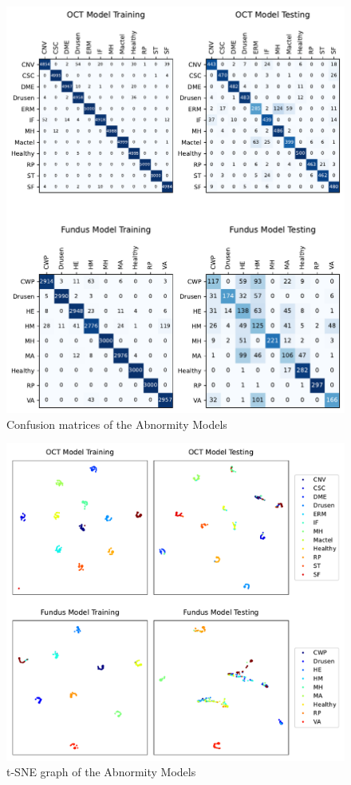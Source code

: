 \documentclass{article}
\begin{document}
	\begin{figure}[htbp]
		\centering
		\includegraphics[width=\linewidth]{Figs/abnormity_confusion_matrix.pdf}
		\caption{Confusion matrices of the Abnormity Models}
		\vspace{0.3cm}
		\label{fig:A_conf_mat}
	\end{figure}
	
	\begin{figure}[htbp]
		\centering
		\includegraphics[width=\linewidth]{Figs/abnormity_tSNE.pdf}
		\caption{t-SNE graph of the Abnormity Models}
		\vspace{0.3cm}
		\label{fig:A_tSNE}
	\end{figure}
	
\end{document}

